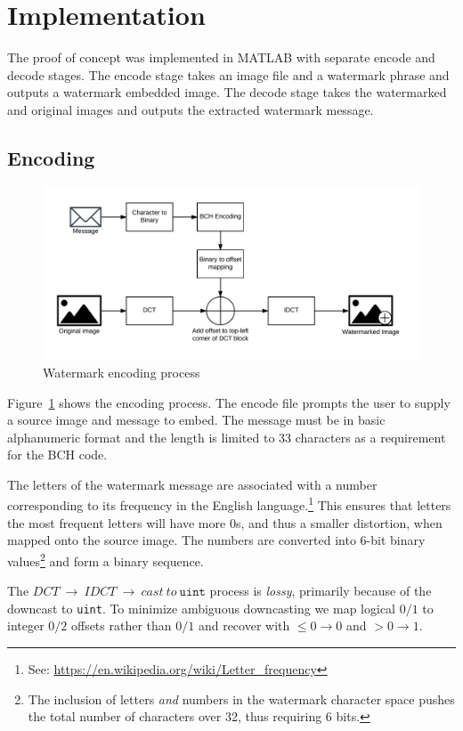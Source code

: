 \section{Implementation}\label{sec:impl}
The proof of concept was implemented in MATLAB with separate encode and decode stages.
The encode stage takes an image file and a watermark phrase and outputs a watermark embedded image.
The decode stage takes the watermarked and original images and outputs the extracted watermark message.

\subsection{Encoding}
\begin{figure}[tbph]
  \centering
  \includegraphics[width=0.75\linewidth]{graphics/encode}
  \caption{Watermark encoding process}
  \label{fig:encode}
\end{figure}

Figure~\ref{fig:encode} shows the encoding process.
The encode file prompts the user to supply a source image and message to embed.
The message must be in basic alphanumeric format and the length is limited to 33 characters as a requirement for the BCH code.

The letters of the watermark message are associated with a number corresponding to its frequency in the English language.\footnote{See: \url{https://en.wikipedia.org/wiki/Letter_frequency}}
This ensures that letters the most frequent letters will have more 0s, and thus a smaller distortion, when mapped onto the source image.
The numbers are converted into 6-bit binary values\footnote{The inclusion of letters \textit{and} numbers in the watermark character space pushes the total number of characters over 32, thus requiring 6 bits.} and form a binary sequence.

The $DCT~\rightarrow~IDCT~\rightarrow~cast~to~\texttt{uint}$ process is \textit{lossy}, primarily because of the downcast to \texttt{uint}.
To minimize ambiguous downcasting we map logical $0/1$ to integer $0/2$ offsets rather than $0/1$ and recover with $\le 0 \rightarrow 0$ and $> 0 \rightarrow 1$.

